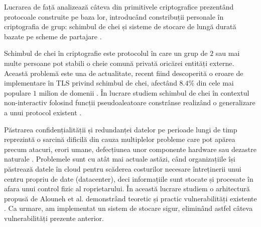 \documentclass[oneside, 12pt]{book}
\begin{document}
\hspace*{5mm}Lucrarea de față analizează câteva din primitivele criptografice prezentând protocoale construite pe baza lor, introducând constribuții personale în criptografia de grup: schimbul de chei și sisteme de stocare de lungă durată bazate pe scheme de partajare \cite{RD:2014, RD:2015}.

\hspace*{5mm}Schimbul de chei în criptografie este protocolul în care un grup de $2$ sau mai multe persoane pot stabili o cheie comună privată oricărei entități externe.
Această problemă este una de actualitate, recent fiind descoperită o eroare de implementare în TLS privind schimbul de chei, afectând $8.4 \%$ din cele mai populare $1$ milion de domenii \cite{adrianimperfect:2015}. În lucrare studiem schimbul de chei în contextul non-interactiv folosind funcții pseudoaleatoare constrânse realizând o generalizare a unui protocol existent \cite{RD:2014}.

\hspace*{5mm}Păstrarea confidențialității și redundanței datelor pe perioade lungi de timp reprezintă o sarcină dificilă din cauza multiplelor probleme care pot apărea precum atacuri, erori umane, defecțiunea unor componente hardware sau dezastre naturale \cite{SGMV:2009}. Problemele sunt cu atât mai actuale astăzi, când organizațiile își păstrează datele în cloud pentru scăderea costurilor necesare întreținerii unui centru propriu de date (datacenter), deci informațiile sunt stocate și procesate în afara unui control fizic al roprietarului. În această lucrare studiem o arhitectură propusă de Alouneh et al. demonstrând teoretic și practic vulnerabilități existente \cite{RD:2015}. Ca urmare, am implementat un sistem de stocare sigur, eliminând astfel câteva vulnerabilități prezente anterior.

\end{document}
